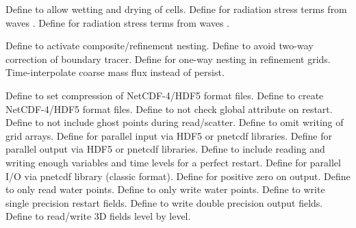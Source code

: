 \begin{klist}
\begin{klist}
  \end{klist}
   \mbox{}
  \begin{klist}
     Define to allow wetting and drying of cells.
     Define for radiation stress terms from
    waves \citep{Mellor_2005}.
     Define for radiation stress terms from
    waves \citep{Mellor_2008}.
  \end{klist}
   \mbox{}
  \begin{klist}
      Define to activate composite/refinement nesting.
     Define to avoid two-way correction
  of boundary tracer.
     Define for one-way nesting in refinement grids.
     Time-interpolate coarse mass flux
  instead of persist.
  \end{klist}
   \mbox{}
  \begin{klist}
     Define to set compression of NetCDF-4/HDF5 format files.
     Define to create NetCDF-4/HDF5 format files.
     Define to not check  global
    attribute on restart.
     Define to not include ghost points during
    read/scatter.
     Define to omit writing of grid arrays.
     Define for parallel input via HDF5 or pnetcdf
    libraries.
     Define for parallel output via HDF5 or pnetcdf
    libraries.
     Define to include reading and writing enough
      variables and time levels for a perfect restart.
     Define for parallel I/O via pnetcdf library
    (classic format).
     Define for positive zero on output.
     Define to only read water points.
     Define to only write water points.
     Define to write single precision restart fields.
     Define to write double precision output fields.
     Define to read/write 3D fields level by level.
  \end{klist}
\end{klist}

